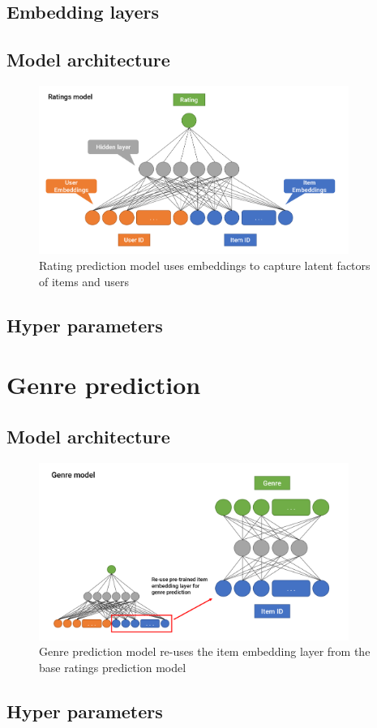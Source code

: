 \subsection{Embedding layers}

\subsection{Model architecture}
\begin{figure}[H]
\centering
\includegraphics[width=0.9\textwidth]{Figures/3_ratings-model.png}
\decoRule
\caption[Ratings prediction model]{Rating prediction model uses embeddings to capture latent factors of items and users}
\label{fig:3_rating-prediction-architecture}
\end{figure}

\subsection{Hyper parameters}

\section{Genre prediction}

\subsection{Model architecture}
\begin{figure}[H]
\centering
\includegraphics[width=0.9\textwidth]{Figures/3_genre-model.png}
\decoRule
\caption[Genre prediction model]{Genre prediction model re-uses the item embedding layer from the base ratings prediction model}
\label{fig:3_genre-prediction-architecture}
\end{figure}

\subsection{Hyper parameters}